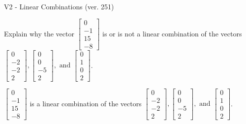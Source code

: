 \begin{exercise}
  \begin{exerciseTitle}V2 - Linear Combinations (ver. 251)\end{exerciseTitle}
  \begin{exerciseStatement}
    Explain why the vector \(\left[\begin{array}{c}
0 \\
-1 \\
15 \\
-8
\end{array}\right]\)  is or is not a linear 
	combination of the vectors \(\left[\begin{array}{c}
0 \\
-2 \\
-2 \\
2
\end{array}\right] , \left[\begin{array}{c}
0 \\
0 \\
-5 \\
2
\end{array}\right] , \text{ and } \left[\begin{array}{c}
0 \\
1 \\
0 \\
2
\end{array}\right]\).
	


  \end{exerciseStatement}
  \begin{exerciseAnswer}
   \(\left[\begin{array}{c}
0 \\
-1 \\
15 \\
-8
\end{array}\right]\) 
  	 is  
	a linear combination of the vectors \(\left[\begin{array}{c}
0 \\
-2 \\
-2 \\
2
\end{array}\right] , \left[\begin{array}{c}
0 \\
0 \\
-5 \\
2
\end{array}\right] , \text{ and } \left[\begin{array}{c}
0 \\
1 \\
0 \\
2
\end{array}\right]\).

	
  


  \end{exerciseAnswer}
\end{exercise}